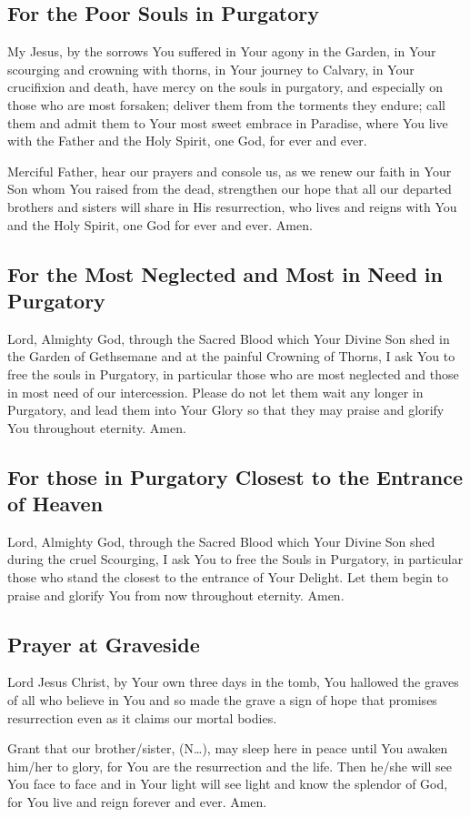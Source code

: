 \documentclass[12pt]{article}
\newcommand{\prayertitle}[1]{\subsection{#1}}
\newcommand{\insertname}{(N\dots)}
\begin{document}
\prayertitle{For the Poor Souls in Purgatory}
My Jesus, by the sorrows You suffered in Your agony in the Garden, in Your scourging and crowning with thorns, in Your journey to Calvary, in Your crucifixion and death, have mercy on the souls in purgatory, and especially on those who are most forsaken;
deliver them from the torments they endure;
call them and admit them to Your most sweet embrace in Paradise, where You live with the Father and the Holy Spirit, one God, for ever and ever.

Merciful Father, hear our prayers and console us, as we renew our faith in Your Son whom You raised from the dead, strengthen our hope that all our departed brothers and sisters will share in His resurrection, who lives and reigns with You and the Holy Spirit, one God for ever and ever.
Amen.
\newpage
\prayertitle{For the Most Neglected and Most in Need in Purgatory}
Lord, Almighty God, through the Sacred Blood which Your Divine Son shed in the Garden of Gethsemane and at the painful Crowning of Thorns, I ask You to free the souls in Purgatory, in particular those who are most neglected and those in most need of our intercession.
Please do not let them wait any longer in Purgatory, and lead them into Your Glory so that they may praise and glorify You throughout eternity.
Amen.

\prayertitle{For those in Purgatory Closest to the Entrance of Heaven}
Lord, Almighty God, through the Sacred Blood which Your Divine Son shed during the cruel Scourging, I ask You to free the Souls in Purgatory, in particular those who stand the closest to the entrance of Your Delight.
Let them begin to praise and glorify You from now throughout eternity.
Amen.

\prayertitle{Prayer at Graveside}
Lord Jesus Christ, by Your own three days in the tomb, You hallowed the graves of all who believe in You and so made the grave a sign of hope that promises resurrection even as it claims our mortal bodies.

Grant that our brother/sister, \insertname, may sleep here in peace until You awaken him/her to glory, for You are the resurrection and the life.
Then he/she will see You face to face and in Your light will see light and know the splendor of God, for You live and reign forever and ever.
Amen.
\end{document}
